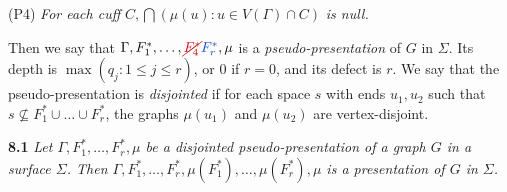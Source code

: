 \hspace*{12pt}(P4) \textit{For each cuff} $C, \bigcap(\mu(u) : u \in V(\Gamma) \cap C)$ \textit{is null.}

Then we say that $\Gamma, F_1^*, \dots, \delm{F_4^*}\fix{F_r^*}, \mu$ is a \textit{pseudo-presentation} of $G$ in $\Sigma$. Its depth is $\max(q_j : 1 \le j \le r)$, or $0$ if $r = 0$, and its defect is $r$. We say that the pseudo-presentation is \textit{disjointed} if for each space $s$ with ends $u_1, u_2$ such that $s \nsubseteq F_1^* \cup \dots \cup F_r^*$, the graphs $\mu(u_1)$ and $\mu(u_2)$ are vertex-disjoint.

\textbf{8.1} \textit{Let $\Gamma, F_1^*, \dots, F_r^*, \mu$ be a disjointed pseudo-presentation of a graph $G$ in a surface $\Sigma$. Then $\Gamma, F_1^*, \dots, F_r^*, \mu(F_1^*), \dots, \mu(F_r^*), \mu$ is a presentation of $G$ in $\Sigma$.}
